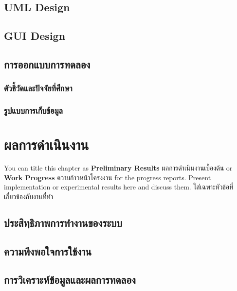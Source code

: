 \documentclass[12pt,oneside,openright,a4paper]{cpe-thai-project}
\begin{document}
\section{UML Design}

\section{GUI Design}

\section{การออกแบบการทดลอง}
\subsection{ตัวชี้วัดและปัจจัยที่ศึกษา}
\subsection{รูปแบบการเก็บข้อมูล}




\chapter{ผลการดำเนินงาน}

You can title this chapter as \textbf{Preliminary Results} ผลการดำเนินงานเบื้องต้น or \textbf{Work Progress} ความก้าวหน้าโครงงาน for the progress reports. Present implementation or experimental results here and discuss them.
ใส่เฉพาะหัวข้อที่เกี่ยวข้องกับงานที่ทำ 

\section{ประสิทฺธิภาพการทำงานของระบบ} 
\section{ความพึงพอใจการใช้งาน}
\section{การวิเคราะห์ข้อมูลและผลการทดลอง}

\end{document}
